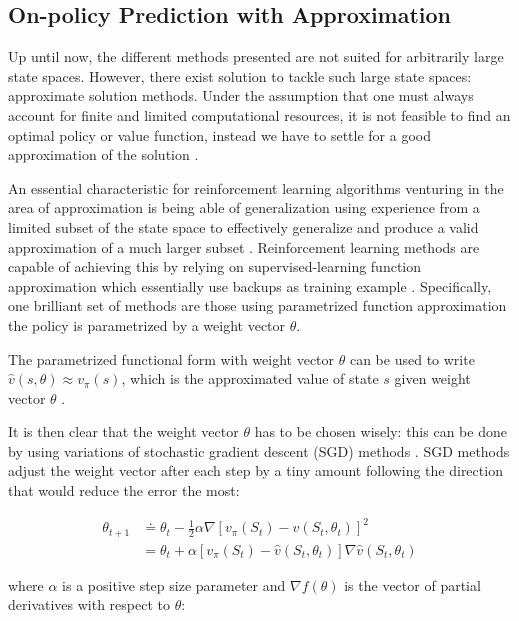 \documentclass{seal_thesis}
\begin{document}
\subsection{On-policy Prediction with Approximation}
\label{subsec:onpol_pred}

Up until now, the different methods presented are not suited for arbitrarily large state spaces. However, there exist solution to tackle such large state spaces: approximate solution methods. Under the assumption that one must always account for finite and limited computational resources, it is not feasible to find an optimal policy or value function, instead we have to settle for a good approximation of the solution \cite[p. 189]{Sutton2017}.

An essential characteristic for reinforcement learning algorithms venturing in the area of approximation is being able of generalization \ie using experience from a limited subset of the state space to effectively generalize and produce a valid approximation of a much larger subset  \cite[p. 189]{Sutton2017}. Reinforcement learning methods are capable of achieving this by relying on supervised-learning function approximation which essentially use backups as training example \cite[p. 222]{Sutton2017}. Specifically, one brilliant set of methods are those using parametrized function approximation \ie the policy is parametrized by a weight vector $\theta$.

The parametrized functional form with weight vector $\theta$ can be used to write $\hat{v}(s,\theta) \approx v_\pi (s)$, which is the approximated value of state $s$ given weight vector $\theta$ \cite[p. 191]{Sutton2017}.

It is then clear that the weight vector $\theta$ has to be chosen wisely: this can be done by using variations of stochastic gradient descent (SGD) methods \cite[p. 223]{Sutton2017}. SGD methods adjust the weight vector after each step by a tiny amount following the direction that would reduce the error the most:

\begin{align}
	\theta_{t+1} &\doteq \theta_t - \frac{1}{2} \alpha \nabla [v_\pi (S_t) - \hat{v} (S_t,\theta_t)]^2\\
	&= \theta_t + \alpha  [v_\pi (S_t) - \hat{v} (S_t,\theta_t)] \nabla \hat{v} (S_t,\theta_t)
\end{align}

where $\alpha$ is a positive step size parameter and $\nabla f(\theta)$ is the vector of partial derivatives with respect to $\theta$:
\end{document}
